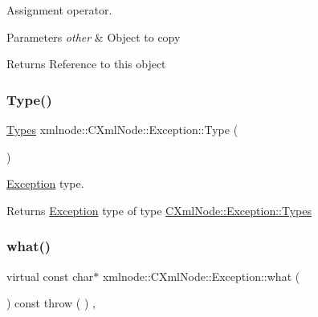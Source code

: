 Assignment operator. 


\begin{DoxyParams}{Parameters}
{\em other} & Object to copy \\
\hline
\end{DoxyParams}
\begin{DoxyReturn}{Returns}
Reference to this object 
\end{DoxyReturn}
\mbox{\label{classxmlnode_1_1_c_xml_node_1_1_exception_a872eb6da8739faf5424baf6515b43793}} 
\subsubsection{\texorpdfstring{Type()}{Type()}}
{\footnotesize\ttfamily \mbox{\hyperlink{classxmlnode_1_1_c_xml_node_1_1_exception_abdbe07531ef4b19192f1fa2f819ed75f}{Types}} xmlnode\+::\+C\+Xml\+Node\+::\+Exception\+::\+Type (\begin{DoxyParamCaption}{ }\end{DoxyParamCaption})\hspace{0.3cm}{\ttfamily [inline]}}



\mbox{\hyperlink{classxmlnode_1_1_c_xml_node_1_1_exception}{Exception}} type. 

\begin{DoxyReturn}{Returns}
\mbox{\hyperlink{classxmlnode_1_1_c_xml_node_1_1_exception}{Exception}} type of type \mbox{\hyperlink{classxmlnode_1_1_c_xml_node_1_1_exception_abdbe07531ef4b19192f1fa2f819ed75f}{C\+Xml\+Node\+::\+Exception\+::\+Types}} 
\end{DoxyReturn}
\mbox{\label{classxmlnode_1_1_c_xml_node_1_1_exception_a55ec16b50448dfa3be05f50051e5ea85}} 
\subsubsection{\texorpdfstring{what()}{what()}}
{\footnotesize\ttfamily virtual const char$\ast$ xmlnode\+::\+C\+Xml\+Node\+::\+Exception\+::what (\begin{DoxyParamCaption}{ }\end{DoxyParamCaption}) const throw ( ) \hspace{0.3cm}{\ttfamily [inline]}, {\ttfamily [virtual]}}



